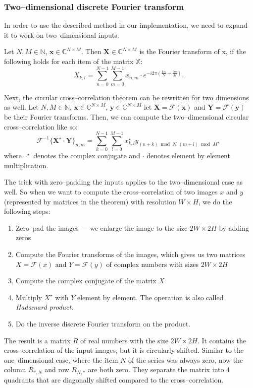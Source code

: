 \subsubsection{Two--dimensional discrete Fourier transform}

In order to use the described method in our implementation, we need to expand it to work on two--dimensional inputs.

Let $N, M \in \mathbb{N}$, $\mathbf{x} \in \mathbb{C}^{N\times M}$. Then $\mathbf{X} \in \mathbb{C}^{N\times M}$ is the Fourier transform of x, if the following holds for each item of the matrix $\mathbb{X}$:
\[
X_{k,l} = \sum_{n=0}^{N-1} \sum_{m=0}^{M-1} x_{n,m} \cdot e^{-i2\pi(\frac{kn}{N} + \frac{lm}{M})}.
\]

Next, the circular cross--correlation theorem can be rewritten for two dimensions as well. Let $N, M \in \mathbb{N}$, $\mathbf{x} \in \mathbb{C}^{N\times M}$, $\mathbf{y} \in \mathbb{C}^{N\times M}$ let $\mathbf{X} = \mathcal{F}(\mathbf{x})$ and $\mathbf{Y} = \mathcal{F}(\mathbf{y})$ be their Fourier transforms. Then, we can compute the two--dimensional circular cross--correlation like so: 
\[
\mathcal{F}^{-1}\{\mathbf{X}^\star \cdot \mathbf{Y}\}_{n,m} = \sum_{k=0}^{N-1} \sum_{l=0}^{M-1} x^\star_{k,l} y_{(n+k)\bmod N, (m+l)\bmod M},
\]
where $\cdot^\star$ denotes the complex conjugate and $\cdot$ denotes element by element multiplication.

The trick with zero--padding the inputs applies to the two--dimensional case as well. So when we want to compute the cross--correlation of two images $x$ and $y$ (represented by matrices in the theorem) with resolution $W \times H$, we do the following steps:
\begin{enumerate}
	\item Zero--pad the images --- we enlarge the image to the size $2W \times 2H$ by adding zeros
	\item Compute the Fourier transforms of the images, which gives us two matrices $X = \mathcal{F}(x)$ and $Y =\mathcal{F}(y)$ of complex numbers with sizes $2W \times 2H$
	\item Compute the complex conjugate of the matrix $X$
	\item Multiply $X^\star$ with $Y$ element by element. The operation is also called \emph{Hadamard product}.
	\item Do the inverse discrete Fourier transform on the product.
\end{enumerate}
The result is a matrix $R$ of real numbers with the size $2W \times 2H$. It contains the cross--correlation of the input images, but it is circularly shifted. Similar to the one--dimensional case, where the item $N$ of the series was always zero, now the column $R_{*,N}$ and row $R_{N,*}$ are both zero. They separate the matrix into 4 quadrants that are diagonally shifted compared to the cross--correlation. 

